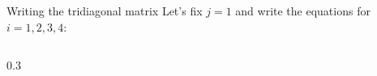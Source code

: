 \documentclass{beamer}
\begin{document}
\begin{frame}{Writing the tridiagonal matrix}
    \vspace{-0.8cm}   
    Let's fix $j = 1$ and write the equations for $i =  1, 2, 3, 4$:
    
    \begin{columns}
        \begin{column}{0.3\textwidth}
            \begin{minipage}{0.48\textwidth}
\end{minipage}
\end{column}
\end{columns}
\end{frame}
\end{document}
